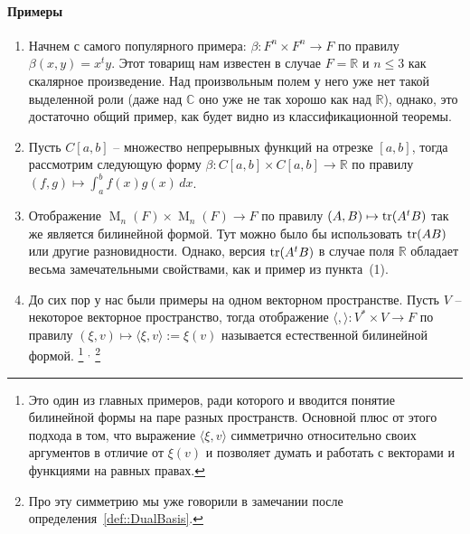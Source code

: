 \paragraph{Примеры}
\begin{enumerate}
\item Начнем с самого популярного примера: $\beta\colon F^n\times F^n \to F$ по правилу $\beta(x,y) = x^t y$.
Этот товарищ нам известен в случае $F = \mathbb R$ и $n\leqslant 3$ как скалярное произведение.
Над произвольным полем у него уже нет такой выделенной роли (даже над $\mathbb C$ оно уже не так хорошо как над $\mathbb R$), однако, это достаточно общий пример, как будет видно из классификационной теоремы.

\item Пусть $C[a,b]$ -- множество непрерывных функций на отрезке $[a,b]$, тогда рассмотрим следующую форму $\beta\colon C[a,b]\times C[a,b]\to \mathbb R$ по правилу $(f,g)\mapsto \int_a^b f(x)g(x)\,dx$.

\item Отображение $\operatorname{M}_n(F)\times \operatorname{M}_n(F)\to F$ по правилу $(A,B)\mapsto \operatorname{tr}(A^tB)$ так же является билинейной формой.
Тут можно было бы использовать $\operatorname{tr}(AB)$ или другие разновидности.
Однако, версия $\operatorname{tr}(A^tB)$ в случае поля $\mathbb R$ обладает весьма замечательными свойствами, как и пример из пункта~(1).

\item До сих пор у нас были примеры на одном векторном пространстве.
Пусть $V$ -- некоторое векторное пространство, тогда отображение $\langle,\rangle\colon V^*\times V\to F$ по правилу $(\xi,v)\mapsto \langle\xi,v\rangle := \xi(v)$ называется естественной билинейной формой.%
\footnote{Это один из главных примеров, ради которого и вводится понятие билинейной формы на паре разных пространств.
Основной плюс от этого подхода в том, что выражение $\langle \xi,v\rangle$ симметрично относительно своих аргументов в отличие от $\xi(v)$ и позволяет думать и работать с векторами и функциями на равных правах.}%
${}^{,}$%
\footnote{Про эту симметрию мы уже говорили в замечании после определения~\ref{def::DualBasis}.}
\end{enumerate}

